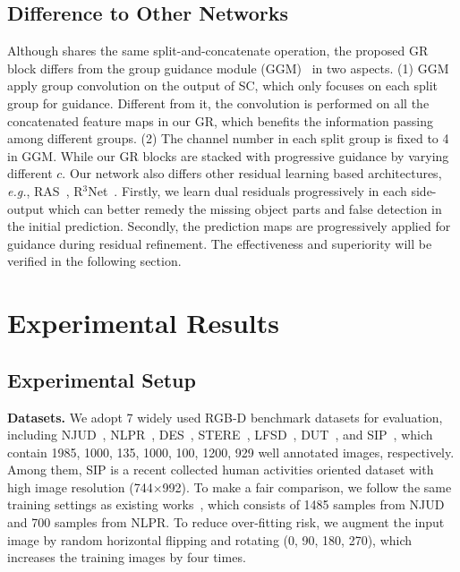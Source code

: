 \documentclass[runningheads]{llncs}
\begin{document}
\subsection{Difference to Other Networks}
Although shares the same split-and-concatenate operation, the proposed GR block differs from the group guidance module (GGM)~\cite{liu2019deep} in two aspects. (1) GGM apply group convolution on the output of SC, which only focuses on each split group for guidance. Different from it, the convolution is performed on all the concatenated feature maps in our GR, which benefits the information passing among different groups. (2) The channel number in each split group is fixed to 4 in GGM. While our GR blocks are stacked with progressive guidance by varying different $c$. Our network also differs other residual learning based architectures, \textit{e.g.}, RAS~\cite{chen2018reverse}\cite{chen2020tip}, R$^{3}$Net~\cite{deng2018r3net}. Firstly, we learn dual residuals progressively in each side-output which can better remedy the missing object parts and false detection in the initial prediction. Secondly, the prediction maps are progressively applied for guidance during residual refinement. The effectiveness and superiority will be verified in the following section.

\section{Experimental Results}
\subsection{Experimental Setup}
\textbf{Datasets.}
We adopt 7 widely used RGB-D benchmark datasets for evaluation, including NJUD~\cite{ju2014depth}, NLPR~\cite{peng2014rgbd}, DES~\cite{cheng2014depth}, STERE~\cite{niu2012leveraging}, LFSD~\cite{li2014saliency},  DUT~\cite{piao2019depth}, and SIP~\cite{fan2019rethinking}, which contain 1985, 1000, 135, 1000, 100, 1200, 929 well annotated images, respectively. Among them, SIP is a recent collected human activities oriented dataset with high image resolution (744$\times$992). To make a fair comparison, we follow the same training settings as existing works~\cite{han2017cnns}\cite{chen2018progressively}\cite{chen2019three}\cite{fan2019rethinking}, which consists of 1485 samples from NJUD and 700 samples from NLPR. To reduce over-fitting risk, we augment the input image by random horizontal flipping and rotating (0\degree, 90\degree, 180\degree, 270\degree), which increases the training images by four times.
\end{document}
